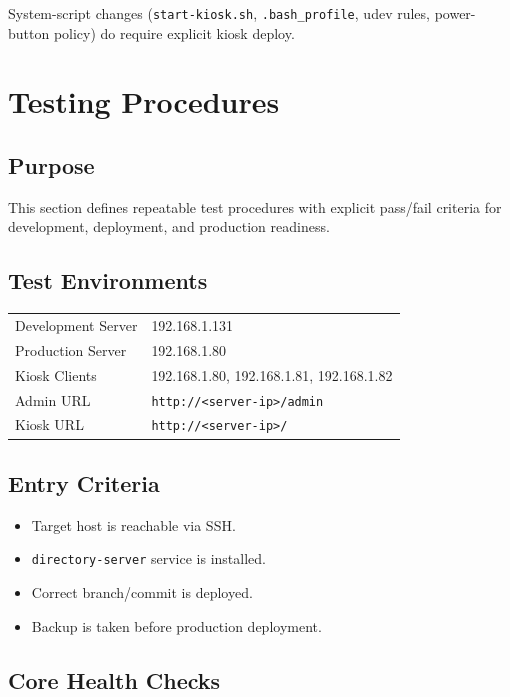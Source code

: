 \documentclass[11pt,letterpaper]{article}
\begin{document}
System-script changes (\texttt{start-kiosk.sh}, \texttt{.bash\_profile}, udev rules, power-button policy) do require explicit kiosk deploy.

\section{Testing Procedures}

\subsection{Purpose}

This section defines repeatable test procedures with explicit pass/fail criteria for development, deployment, and production readiness.

\subsection{Test Environments}

\begin{longtable}{p{2.2in} p{3.1in}}
Development Server & 192.168.1.131 \\
Production Server & 192.168.1.80 \\
Kiosk Clients & 192.168.1.80, 192.168.1.81, 192.168.1.82 \\
Admin URL & \texttt{http://<server-ip>/admin} \\
Kiosk URL & \texttt{http://<server-ip>/} \\
\end{longtable}

\subsection{Entry Criteria}

\begin{itemize}
\item Target host is reachable via SSH.
\item \texttt{directory-server} service is installed.
\item Correct branch/commit is deployed.
\item Backup is taken before production deployment.
\end{itemize}

\subsection{Core Health Checks}
\end{document}
